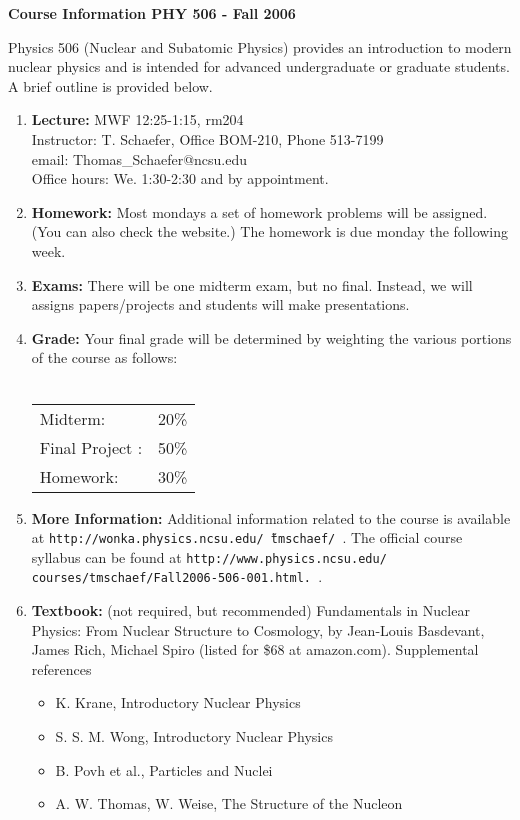    
\pagestyle{plain}

\centerline{\bf\Large Course Information PHY 506 - Fall 2006}
\vspace*{0.5cm}

 Physics 506 (Nuclear and Subatomic Physics) provides
an introduction to modern nuclear physics and is 
intended for advanced undergraduate or graduate 
students. A brief outline is provided below. 

\begin{enumerate}

\item{ {\bf Lecture:} MWF 12:25-1:15, rm204\\
 Instructor: T. Schaefer, Office BOM-210, Phone 513-7199\\
 email: Thomas\_Schaefer@ncsu.edu\\
 Office hours: We. 1:30-2:30 and by appointment.}

\item{ {\bf Homework:} Most mondays a set of homework problems 
 will be assigned. (You can also check the website.) The homework 
 is due monday the following week.}

\item{ {\bf Exams:} There will be one midterm exam, but no final.
Instead, we will assigns papers/projects and students will 
make presentations. }

\item{ {\bf Grade:} Your final grade will be determined by 
 weighting the various portions of the course as follows:\\ \\
 \begin{tabular}{ll}
 Midterm:       &  20\% \\
 Final Project :&  50\% \\
 Homework:      &  30\% \\
 \end{tabular} }

\item{ {\bf More Information:} Additional information related to 
 the course is available at 
{\tt http://wonka.physics.ncsu.edu/\~\ $\!\!\!$tmschaef/ }.
The official course syllabus can be found at
{\tt http://www.physics.ncsu.edu/
courses/tmschaef/Fall2006-506-001.html. }.}

\item{{\bf Textbook:} (not required, but recommended) Fundamentals 
in Nuclear Physics: From Nuclear Structure to Cosmology, by Jean-Louis 
Basdevant, James Rich, Michael Spiro (listed for \$68 at amazon.com). 
Supplemental references
 \begin{itemize}
 \item{K. Krane, Introductory Nuclear Physics}
 \item{S. S. M. Wong, Introductory Nuclear Physics}
 \item{B. Povh et al., Particles and Nuclei}
 \item{A. W. Thomas, W. Weise, The Structure of the Nucleon}
 \end{itemize}

}
\end{enumerate}
